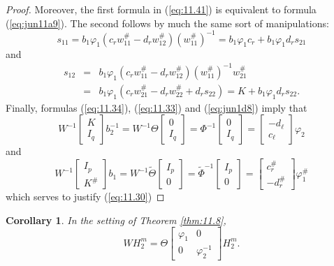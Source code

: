 \documentclass[12pt,twoside,a4paper]{amsart}
\newtheorem{corollary}[thm]{Corollary}
\theoremstyle{definition}
\numberwithin{equation}{section}
\begin{document}
\begin{proof}
Moreover, the first formula in (\ref{eq:11.41}) is equivalent
to formula (\ref{eq:jun11a9}). The second follows by much the same sort of
manipulations:
$$
s_{11}=b_1\varphi_1(c_rw_{11}^\#-d_rw_{12}^\#)(w_{11}^\#)^{-1}=
b_1\varphi_1c_r+b_1\varphi_1d_rs_{21}
$$
and
\begin{eqnarray*}
s_{12}&=&b_1\varphi_1(c_rw_{11}^\#-d_rw_{12}^\#)(w_{11}^\#)^{-1}w_{21}^\#
\\
&=&
b_1\varphi_1(c_rw_{21}^\#-d_rw_{22}^\#+d_rs_{22})=K+b_1\varphi_1d_rs_{22}.
\end{eqnarray*}
Finally, formulas (\ref{eq:11.34}), (\ref{eq:11.33}) and (\ref{eq:jun1d8})
imply that
$$
W^{-1}\begin{bmatrix}
  K \\ I_q
\end{bmatrix}
b_2^{-1}=W^{-1}\Theta\begin{bmatrix}0\\I_q\end{bmatrix}=
\Phi^{-1}\begin{bmatrix}0\\I_q\end{bmatrix}=\begin{bmatrix}-d_\ell\\c_\ell
\end{bmatrix}\varphi_2$$
and
$$
W^{-1}\begin{bmatrix}I_p\\ K^\#\end{bmatrix}b_1=
W^{-1}{{{\widetilde {\Theta}} }}\begin{bmatrix}I_p\\0\end{bmatrix}={{{\widetilde {\Phi}} }}^{-1}
\begin{bmatrix}I_p\\0\end{bmatrix}=
\begin{bmatrix}c_r^\#\\-d_r^\#\end{bmatrix}\varphi_1^\#
$$
which serves to justify (\ref{eq:11.30})
\end{proof}

\begin{corollary}
\label{cor:jun2a8}
In the setting of Theorem \ref{thm:11.8},
\begin{equation}
\label{eq:jun2a8}
WH_2^m=\Theta \begin{bmatrix}\varphi_1 & 0\\0&\varphi_2^{-1}\end{bmatrix}H_2^m.
\end{equation}
\end{corollary}
\end{document}
